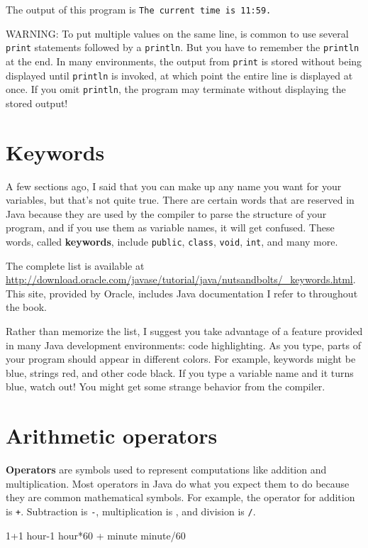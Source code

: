 The output of this program is {\tt The current time is 11:59.}

WARNING: To put multiple values on the same line, is common to use several {\tt print} statements followed by a {\tt println}.
But you have to remember the {\tt println} at the end.
In many environments, the output from {\tt print} is stored without being displayed until {\tt println} is invoked, at which point the entire line is displayed at once.
If you omit {\tt println}, the program may terminate without displaying the stored output!


\section{Keywords}

A few sections ago, I said that you can make up any name you want for your variables, but that's not quite true.
There are certain words that are reserved in Java because they are used by the compiler to parse the structure of your program, and if you use them as variable names, it will get confused.
These words, called {\bf keywords}, include {\tt public}, {\tt class}, {\tt void}, {\tt int}, and many more.

The complete list is available at \url{http://download.oracle.com/javase/tutorial/java/nutsandbolts/_keywords.html}.
This site, provided by Oracle, includes Java documentation I refer to throughout the book.

Rather than memorize the list, I suggest you take advantage of a feature provided in many Java development environments: code highlighting.
As you type, parts of your program should appear in different colors.
For example, keywords might be blue, strings red, and other code black.
If you type a variable name and it turns blue, watch out!
You might get some strange behavior from the compiler.


\section{Arithmetic operators}

{\bf Operators} are symbols used to represent computations like addition and multiplication.
Most operators in Java do what you expect them to do because they are common mathematical symbols.
For example, the operator for addition is {\tt +}.
Subtraction is {\tt -}, multiplication is {\tt *}, and division is {\tt /}.

\begin{code}
1+1        hour-1       hour*60 + minute     minute/60
\end{code}

